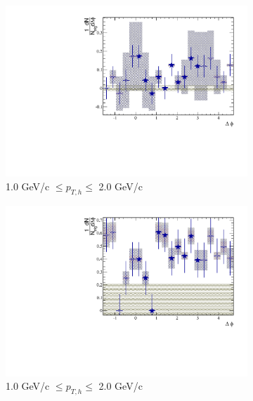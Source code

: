 \begin{figure}[htbp]
\begin{subfigure}{0.5\textwidth}
		\includegraphics[width=\textwidth]{Plots/Correlations/subtracted/NPE_eh_corr_subtracted_primpt_4_5_cent_4_6_assopt_2_2.pdf}
		\caption{1.0 GeV/c $\leq p_{T,h} \leq$ 2.0 GeV/c}
		\label{fig:Sub2040c}
	\end{subfigure}	
	\begin{subfigure}{0.5\textwidth}
		\includegraphics[width=\textwidth]{Plots/Correlations/subtracted/NPE_eh_corr_subtracted_primpt_6_8_cent_4_6_assopt_2_2.pdf}
		\caption{1.0 GeV/c $\leq p_{T,h} \leq$ 2.0 GeV/c}
		\label{fig:Sub2040d}
	\end{subfigure}	
	\begin{subfigure}{0.5\textwidth}

\end{subfigure}
\end{figure}
